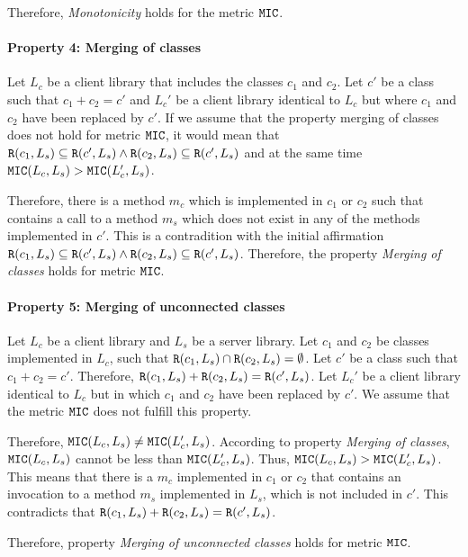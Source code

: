 Therefore, \textit{Monotonicity} holds for the metric $\verb|MIC|$.

\paragraph{Property 4: Merging of classes}
Let $L_c$ be a client library that includes the classes $c_1$ and $c_2$. Let $c'$ be a class such that $c_1 + c_2 = c'$ and $L_c'$ be a client library identical to $L_c$ but where $c_1$ and $c_2$ have been replaced by $c'$. If we assume that the property merging of classes does not hold for metric $\verb|MIC|$, it would mean that $\verb|R|(c_1, L_s) \subseteq \verb|R|(c', L_s) \land \verb|R|(c_2, L_s) \subseteq \verb|R|(c', L_s)$ and at the same time $\verb|MIC|(L_c, L_s) > \verb|MIC|(L_c', L_s)$.

Therefore, there is a method $m_c$ which is implemented in $c_1$ or $c_2$ such that contains a call to a method $m_s$ which does not exist in any of the methods implemented in $c'$. This is a contradition with the initial affirmation $\verb|R|(c_1, L_s) \subseteq \verb|R|(c', L_s) \land \verb|R|(c_2, L_s) \subseteq \verb|R|(c', L_s)$. Therefore, the property \textit{Merging of classes} holds for metric $\verb|MIC|$.

\paragraph{Property 5: Merging of unconnected classes}
Let $L_c$ be a client library and $L_s$ be a server library. Let $c_1$ and $c_2$ be classes implemented in $L_c$, such that $\verb|R|(c_1, L_s) \cap \verb|R|(c_2, L_s) = \emptyset$. Let $c'$ be a class such that $c_1 + c_2 = c'$. Therefore, $\verb|R|(c_1, L_s) + \verb|R|(c_2, L_s) = \verb|R|(c', L_s)$. Let $L_c'$ be a client library identical to $L_c$ but in which $c_1$ and $c_2$ have been replaced by $c'$. We assume that the metric $\verb|MIC|$ does not fulfill this property.

Therefore, $\verb|MIC|(L_c, L_s) \neq \verb|MIC|(L_c', L_s)$. According to property \textit{Merging of classes}, $\verb|MIC|(L_c, L_s)$ cannot be less than $\verb|MIC|(L_c', L_s)$. Thus, $\verb|MIC|(L_c, L_s) > \verb|MIC|(L_c', L_s)$. This means that there is a $m_c$ implemented in $c_1$ or $c_2$ that contains an invocation to a method $m_s$ implemented in $L_s$, which is not included in $c'$. This contradicts that $\verb|R|(c_1, L_s) + \verb|R|(c_2, L_s) = \verb|R|(c', L_s)$.

Therefore, property \textit{Merging of unconnected classes} holds for metric $\verb|MIC|$.

